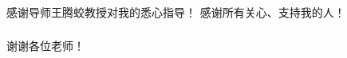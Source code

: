 \begin{transparentFootline_lastpages}
{

\begin{frame}
\frametitle{}
{\color{white}感谢导师王腾蛟教授对我的悉心指导！}
\vfill
{\color{white}感谢所有关心、支持我的人！}
\vfill
\end{frame}
}
\end{transparentFootline_lastpages}


\begin{transparentFootline_lastpages}
{

\begin{frame}
\frametitle{}
{\color{white}谢谢各位老师！}
\vfill
\end{frame}
}
\end{transparentFootline_lastpages}